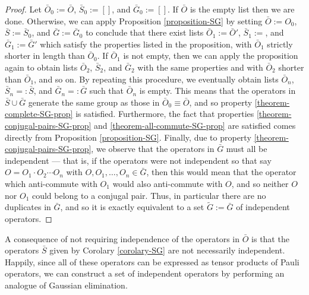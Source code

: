 \documentclass[twocolumn,showpacs,preprintnumbers,amsmath,amssymb,nofootinbib,pra,floatfix]{revtex4}
\newenvironment{remark}[1][Remark]{\begin{trivlist}
\item[\hskip \labelsep {\bfseries #1}]}{\end{trivlist}}
\newcommand{\lst}{\bar}
\newcommand{\set}{\tilde}
\begin{document}
\begin{proof}
Let $\lst O_0:=\lst O$, $\lst S_0:=[]$, and $\lst G_0:=[]$.  If $\lst O$ is the empty list then we are done.  Otherwise, we can apply Proposition \ref{proposition-SG} by setting $\lst O := O_0$, $\lst S:=\lst S_0$, and $\lst G := \lst G_0$ to conclude that there exist lists $\lst O_1:=\lst O'$, $\lst S_1:=$, and $\lst G_1:=\lst G'$ which satisfy the properties listed in the proposition, with $\lst O_1$ strictly shorter in length than $\lst O_0$.  If $\lst O_1$ is not empty, then we can apply the proposition again to obtain lists $\lst O_2$, $\lst S_2$, and $\lst G_2$ with the same properties and with $\lst O_2$ shorter than $\lst O_1$, and so on.  By repeating this procedure, we eventually obtain lists $\lst O_n$, $\lst S_n=:\lst S$, and $\lst G_n=:\lst G$ such that $\lst O_n$ is empty.  This means that the operators in $\lst S \cup \lst G$ generate the same group as those in $\lst O_0\equiv \lst O$, and so property \ref{theorem-complete-SG-prop} is satisfied.  Furthermore, the fact that properties \ref{theorem-conjugal-pairs-SG-prop} and \ref{theorem-all-commute-SG-prop} are satisfied comes directly from Proposition \ref{proposition-SG}.  Finally, due to property \ref{theorem-conjugal-pairs-SG-prop}, we observe that the operators in $\lst G$ must all be independent --- that is, if the operators were not independent so that say $O=O_1\cdot O_2\cdots O_n$ with $O,O_1,\dots,O_n\in\lst G$, then this would mean that the operator which anti-commute with $O_1$ would also anti-commute with $O$, and so neither $O$ nor $O_1$ could belong to a conjugal pair.  Thus, in particular there are no duplicates in $\lst G$, and so it is exactly equivalent to a set $\set G:=\lst G$ of independent operators.
\end{proof}
\begin{remark}
A consequence of not requiring independence of the operators in $\lst O$ is that the operators $\lst S$ given by Corolary \ref{corolary-SG} are not necessarily independent.  Happily, since all of these operators can be expressed as tensor products of Pauli operators, we can construct a set of independent operators by performing an analogue of Gaussian elimination.
\end{remark}
\end{document}
